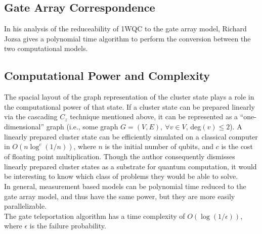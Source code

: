 \documentclass[twocolumn]{IEEEtran11}
\begin{document}
\subsection{Gate Array Correspondence}
In his analysis of the reduceability of 1WQC to the gate array model, Richard Jozsa gives a polynomial time algorithm to perform the conversion between the two computational models\cite{jozsa2006introduction}. 

\subsection{Computational Power and Complexity}
The spacial layout of the graph representation of the cluster state plays a role in the computational power of that state. If a cluster state can be prepared linearly via the cascading $C_z$ technique mentioned above, it can be represented as a  ``one-dimensional'' graph (i.e., some graph $G=(V,E),\ \forall v\in V$, deg$(v)\leq 2$). A linearly prepared cluster state can be efficiently simulated on a classical computer in $O(n\log ^c (1/n))$, where $n$ is the initial number of qubits, and $c$ is the cost of floating point multiplication\cite{nielsen2006cluster}. Though the author consequently dismisses linearly prepared cluster states as a substrate for quantum computation, it would be interesting to know which class of problems they would be able to solve. \\
In general, measurement based models can be polynomial time reduced to the gate array model, and thus have the same power, but they are more easily parallelizable\cite{jozsa2006introduction}.\\
The gate teleportation algorithm\cite{nielsen108020universal} has a time complexity of $O(\log (1/\epsilon))$, where $\epsilon$ is the failure probability. 



\end{document}
